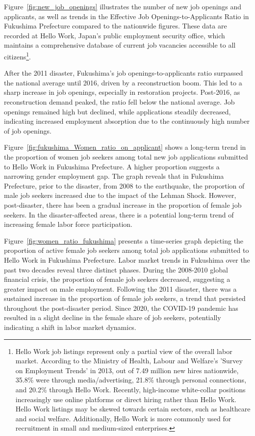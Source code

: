\documentclass[a4paper,12pt]{article}
\begin{document}
Figure~\ref{fig:new_job_openings} illustrates the number of new job openings and applicants, as well as trends in the Effective Job Openings-to-Applicants Ratio in Fukushima Prefecture compared to the nationwide figures. These data are recorded at Hello Work, Japan’s public employment security office, which maintains a comprehensive database of current job vacancies accessible to all citizens\footnote{Hello Work job listings represent only a partial view of the overall labor market. According to the Ministry of Health, Labour and Welfare's 'Survey on Employment Trends' in 2013, out of 7.49 million new hires nationwide, 35.8\% were through media/advertising, 21.8\% through personal connections, and 20.2\% through Hello Work. Recently, high-income white-collar positions increasingly use online platforms or direct hiring rather than Hello Work. Hello Work listings may be skewed towards certain sectors, such as healthcare and social welfare. Additionally, Hello Work is more commonly used for recruitment in small and medium-sized enterprises.}.

After the 2011 disaster, Fukushima's job openings-to-applicants ratio surpassed the national average until 2016, driven by a reconstruction boom. This led to a sharp increase in job openings, especially in restoration projects. Post-2016, as reconstruction demand peaked, the ratio fell below the national average. Job openings remained high but declined, while applications steadily decreased, indicating increased employment absorption due to the continuously high number of job openings.

Figure~\ref{fig:fukushima_Women_ratio_on_applicant} shows a long-term trend in the proportion of women job seekers among total new job applications submitted to Hello Work in Fukushima Prefecture. A higher proportion suggests a narrowing gender employment gap. The graph reveals that in Fukushima Prefecture, prior to the disaster, from 2008 to the earthquake, the proportion of male job seekers increased due to the impact of the Lehman Shock. However, post-disaster, there has been a gradual increase in the proportion of female job seekers. In the disaster-affected areas, there is a potential long-term trend of increasing female labor force participation.

Figure~\ref{fig:women_ratio_fukushima} presents a time-series graph depicting the proportion of active female job seekers among total job applications submitted to Hello Work in Fukushima Prefecture. Labor market trends in Fukushima over the past two decades reveal three distinct phases. During the 2008-2010 global financial crisis, the proportion of female job seekers decreased, suggesting a greater impact on male employment. Following the 2011 disaster, there was a sustained increase in the proportion of female job seekers, a trend that persisted throughout the post-disaster period. Since 2020, the COVID-19 pandemic has resulted in a slight decline in the female share of job seekers, potentially indicating a shift in labor market dynamics.
\end{document}
